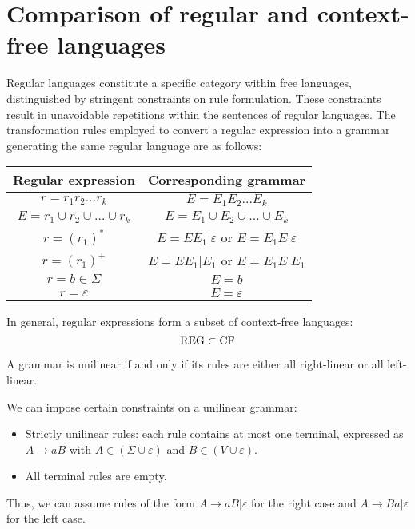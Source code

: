 \section{Comparison of regular and context-free languages}

Regular languages constitute a specific category within free languages, distinguished by stringent constraints on rule formulation.
These constraints result in unavoidable repetitions within the sentences of regular languages. 
The transformation rules employed to convert a regular expression into a grammar generating the same regular language are as follows:
\begin{table}[H]
    \centering
    \begin{tabular}{cc}
    \hline
    \textbf{Regular expression}         & \textbf{Corresponding grammar}                \\ \hline
    $r=r_1r_2\dots r_k$                 & $E=E_1E_2 \dots E_k$                          \\ 
    $E=r_1\cup r_2\cup \dots\cup r_k$   & $E=E_1 \cup E_2 \cup \dots \cup E_k$          \\
    $r=(r_1)^{*}$                       & $E=EE_1|\varepsilon$ or $E=E_1E|\varepsilon$  \\
    $r=(r_1)^{+}$                       & $E=EE_1|E_1$ or $E=E_1E|E_1$                  \\
    $r = b \in \Sigma$                  & $E=b$                                         \\
    $r=\varepsilon$                     & $E=\varepsilon$                               \\ \hline
    \end{tabular}
\end{table}
In general, regular expressions form a subset of context-free languages:
\[\textnormal{REG} \subset \textnormal{CF}\] 
\begin{definition}
    A grammar is unilinear if and only if its rules are either all right-linear or all left-linear.
\end{definition}
We can impose certain constraints on a unilinear grammar:
\begin{itemize}
    \item Strictly unilinear rules: each rule contains at most one terminal, expressed as $A \rightarrow aB$ with $A \in (\Sigma \cup \varepsilon)$ and $B \in (V \cup \varepsilon)$.
    \item All terminal rules are empty. 
\end{itemize}
Thus, we can assume rules of the form $A \rightarrow aB|\varepsilon$ for the right case and $A \rightarrow Ba|\varepsilon$ for the left case. 

